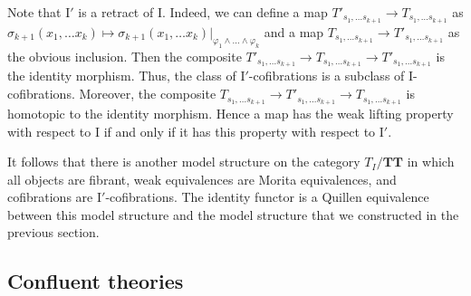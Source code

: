 \documentclass[reqno]{amsart}
\theoremstyle{definition}
\theoremstyle{remark}
\newcommand{\cat}[1]{\mathbf{#1}}
\newcommand{\algtt}{\cat{TT}}
\newcommand{\I}{\mathrm{I}}
\numberwithin{figure}{section}
\begin{document}
Note that $\I'$ is a retract of $\I$.
Indeed, we can define a map $T'_{s_1, \ldots s_{k+1}} \to T_{s_1, \ldots s_{k+1}}$ as $\sigma_{k+1}(x_1, \ldots x_k) \mapsto \sigma_{k+1}(x_1, \ldots x_k)|_{\varphi_1 \land \ldots \land \varphi_k}$
and a map $T_{s_1, \ldots s_{k+1}} \to T'_{s_1, \ldots s_{k+1}}$ as the obvious inclusion.
Then the composite $T'_{s_1, \ldots s_{k+1}} \to T_{s_1, \ldots s_{k+1}} \to T'_{s_1, \ldots s_{k+1}}$ is the identity morphism.
Thus, the class of $\I'$-cofibrations is a subclass of $\I$-cofibrations.
Moreover, the composite $T_{s_1, \ldots s_{k+1}} \to T'_{s_1, \ldots s_{k+1}} \to T_{s_1, \ldots s_{k+1}}$ is homotopic to the identity morphism.
Hence a map has the weak lifting property with respect to $\I$ if and only if it has this property with respect to $\I'$.

It follows that there is another model structure on the category $T_I/\algtt$ in which all objects are fibrant, weak equivalences are Morita equivalences, and cofibrations are $\I'$-cofibrations.
The identity functor is a Quillen equivalence between this model structure and the model structure that we constructed in the previous section.

\subsection{Confluent theories}
\end{document}
